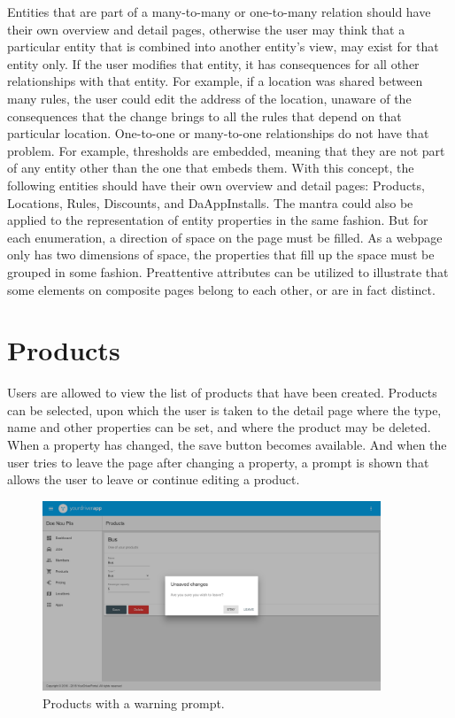 Entities that are part of a many-to-many or one-to-many relation should have their own overview and detail pages, otherwise the user may think that a particular entity that is combined into another entity's view, may exist for that entity only. If the user modifies that entity, it has consequences for all other relationships with that entity. For example, if a location was shared between many rules, the user could edit the address of the location, unaware of the consequences that the change brings to all the rules that depend on that particular location. One-to-one or many-to-one relationships do not have that problem. For example, thresholds are embedded, meaning that they are not part of any entity other than the one that embeds them. With this concept, the following entities should have their own overview and detail pages: Products, Locations, Rules, Discounts, and DaAppInstalls. The mantra could also be applied to the representation of entity properties in the same fashion. But for each enumeration, a direction of space on the page must be filled. As a webpage only has two dimensions of space, the properties that fill up the space must be grouped in some fashion. Preattentive attributes can be utilized to illustrate that some elements on composite pages belong to each other, or are in fact distinct.

\section{Products}
Users are allowed to view the list of products that have been created. Products can be selected, upon which the user is taken to the detail page where the type, name and other properties can be set, and where the product may be deleted. When a property has changed, the save button becomes available. And when the user tries to leave the page after changing a property, a prompt is shown that allows the user to leave or continue editing a product.

\begin{figure}[H]
	\centering
	\includegraphics[width=0.9\textwidth]{Products}
	\caption[Products Component]{Products with a warning prompt.}
	\label{fig:Products Component}
\end{figure}

